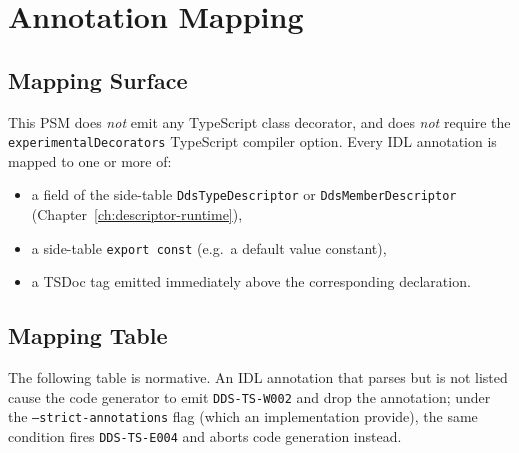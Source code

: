 \documentclass{../styles/zerodds-vendor-spec}
\begin{document}
\section{Annotation Mapping}\label{sec:annotation-mapping}

\subsection{Mapping Surface}

This PSM does \emph{not} emit any TypeScript class decorator, and
does \emph{not} require the \texttt{experimentalDecorators} TypeScript
compiler option. Every IDL annotation is mapped to one or more of:

\begin{itemize}[noitemsep]
  \item a field of the side-table \texttt{DdsTypeDescriptor} or
        \texttt{DdsMemberDescriptor}
        (Chapter~\ref{ch:descriptor-runtime}),
  \item a side-table \texttt{export const} (e.g.\ a default value
        constant),
  \item a TSDoc tag emitted immediately above the corresponding
        declaration.
\end{itemize}

\subsection{Mapping Table}

The following table is normative. An IDL annotation that
parses but is not listed  cause the code generator
to emit \texttt{DDS-TS-W002} and drop the annotation; under the
\texttt{--strict-annotations} flag (which an implementation
 provide), the same condition fires
\texttt{DDS-TS-E004} and aborts code generation instead.
\end{document}
